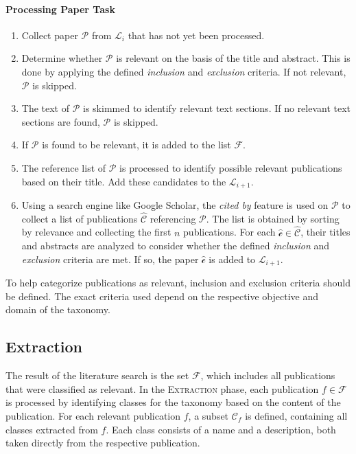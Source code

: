 \paragraph{Processing Paper Task}
\label{enum:processing_paper_task}
\begin{enumerate}
    \item Collect paper $\mathcal{P}$ from $\mathcal{L}_i$ that has not yet been processed.
    \item Determine whether $\mathcal{P}$ is relevant on the basis of the title and abstract. This is done by applying the defined \emph{inclusion} and \emph{exclusion} criteria. If not relevant, $\mathcal{P}$ is skipped.
    \item The text of $\mathcal{P}$ is skimmed to identify relevant text sections. If no relevant text sections are found, $\mathcal{P}$ is skipped.
    \item If $\mathcal{P}$ is found to be relevant, it is added to the list $\mathcal{F}$.
    \item The reference list of $\mathcal{P}$ is processed to identify possible relevant publications based on their title. Add these candidates to the $\mathcal{L}_{i+1}$.
    \item Using a search engine like Google Scholar, the \emph{cited by} feature is used on $\mathcal{P}$ to collect a list of publications $\hat{\mathcal{C}}$ referencing $\mathcal{P}$. The list is obtained by sorting by relevance and collecting the first $n$ publications. For each $\hat{\mathcal{c}} \in\hat{\mathcal{C}}$, their titles and abstracts are analyzed to consider whether the defined \emph{inclusion} and \emph{exclusion} criteria are met. If so, the paper $\hat{\mathcal{c}}$ is added to $\mathcal{L}_{i+1}$.
\end{enumerate}

To help categorize publications as relevant, inclusion and exclusion criteria should be defined. The exact criteria used depend on the respective objective and domain of the taxonomy.

\subsection{Extraction}

The result of the literature search is the set $\mathcal{F}$, which includes all publications that were classified as relevant. In the \textsc{Extraction} phase, each publication $f \in \mathcal{F}$ is processed by identifying classes for the taxonomy based on the content of the publication. For each relevant publication $f$, a subset $\mathcal{C}_{f}$ is defined, containing all classes extracted from $f$. Each class consists of a name and a description, both taken directly from the respective publication.


